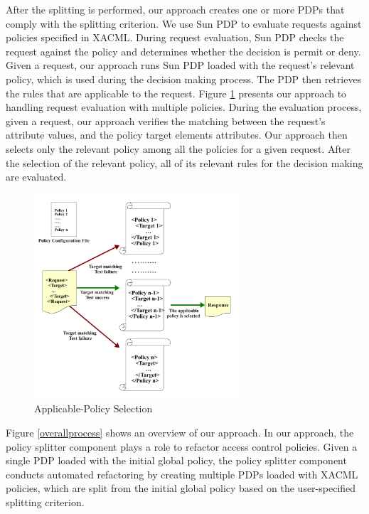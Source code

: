 After the splitting is performed, our approach creates one or more PDPs that comply with the splitting criterion.
We use Sun PDP \cite{sunxacml} to evaluate requests against policies specified in XACML.
During request evaluation, Sun PDP checks the request against the policy and determines whether the
decision is permit or deny. Given a request, our approach runs Sun PDP loaded with the request's relevant policy,
 which is used during the decision making process. The PDP then retrieves the rules that are applicable to the request.
Figure \ref{requestevaluation} presents our approach to handling request evaluation with multiple policies. 
During the evaluation process, given a request, our approach verifies the matching between the request's attribute values, 
and the policy target elements attributes. Our approach then selects only the relevant policy among all the policies for a given request.
After the selection of the relevant policy, all of its relevant rules for the decision making are evaluated.
\begin{figure}[!h]
\begin{center}
\includegraphics[width=3in, height=3in]{requestevaluation}
\caption{Applicable-Policy Selection}
\label{requestevaluation}
\end{center}
\end{figure}
Figure \ref{overallprocess} shows an overview of our approach.
In our approach, the policy splitter component plays a role to refactor access control policies.
Given a single PDP loaded with the initial global policy, the policy splitter component conducts automated refactoring by creating multiple PDPs loaded with XACML policies, 
which are split from the initial global policy based on the user-specified splitting criterion. 

